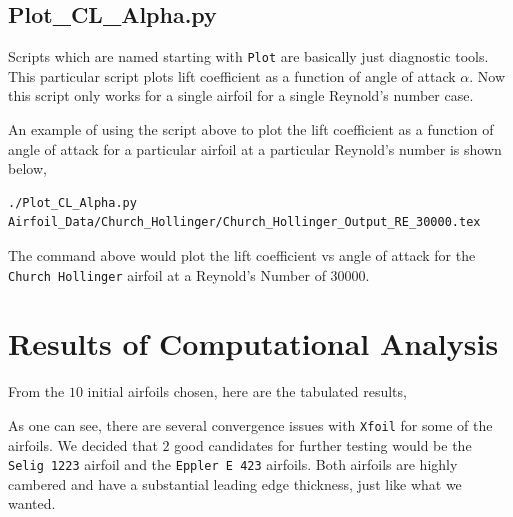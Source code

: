 \subsection{Plot\_CL\_Alpha.py}

Scripts which are named starting with \texttt{Plot} are basically just diagnostic tools. This particular script plots lift coefficient as a function of angle of attack $\alpha$. Now this script only works for a single airfoil for a single Reynold's number case.

$$$$
An example of using the script above to plot the lift coefficient as a function of angle of attack for a particular airfoil at a particular Reynold's number is shown below,
\begin{lstlisting}
./Plot_CL_Alpha.py Airfoil_Data/Church_Hollinger/Church_Hollinger_Output_RE_30000.tex 
\end{lstlisting}
The command above would plot the lift coefficient vs angle of attack for the \texttt{Church Hollinger} airfoil at a Reynold's Number of $30000$.

\section{Results of Computational Analysis}

From the $10$ initial airfoils chosen, here are the tabulated results,

$$$$
As one can see, there are several convergence issues with \texttt{Xfoil} for some of the airfoils. We decided that $2$ good candidates for further testing would be the \texttt{Selig 1223} airfoil and the \texttt{Eppler E 423} airfoils. Both airfoils are highly cambered and have a substantial leading edge thickness, just like what we wanted.

